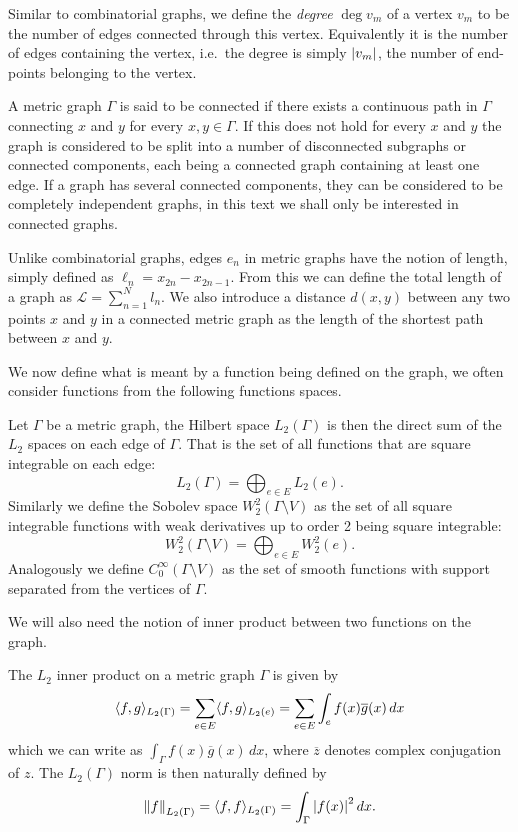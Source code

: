 Similar to combinatorial graphs, we define the \emph{degree} $\deg v_m$ of a vertex $v_m$ to be the number of edges connected through this vertex. Equivalently it is the number of edges containing the vertex, i.e.\ the degree is simply $\left\lvert v_m\right\rvert$, the number of end-points belonging to the vertex.

A metric graph $\Gamma$ is said to be connected if there exists a continuous path in $\Gamma$ connecting $x$ and $y$ for every $x, y \in \Gamma$. If this does not hold for every $x$ and $y$ the graph is considered to be split into a number of disconnected subgraphs or connected components, each being a connected graph containing at least one edge. If a graph has several connected components, they can be considered to be completely independent graphs, in this text we shall only be interested in connected graphs.

Unlike combinatorial graphs, edges $e_n$ in metric graphs have the notion of length, simply defined as $\ell_n = x_{2n} - x_{2n-1}$. From this we can define the total length of a graph as $\mathcal{L} = \sum_{n=1}^{N} l_n$. We also introduce a distance $d(x, y)$ between any two points $x$ and $y$ in a connected metric graph as the length of the shortest path between $x$ and $y$.

We now define what is meant by a function being defined on the graph, we often consider functions from the following functions spaces.

\begin{definition}
  Let $\Gamma$ be a metric graph, the Hilbert space $L_2(\Gamma)$ is then the direct sum of the $L_2$ spaces on each edge of $\Gamma$. That is the set of all functions that are square integrable on each edge:
  \[
    L_2(\Gamma) = \bigoplus_{e \in E} L_2(e).
  \]
  Similarly we define the Sobolev space $W_2^2(\Gamma\setminus V)$ as the set of all square integrable functions with weak derivatives up to order 2 being square integrable:
  \[
    W_2^2(\Gamma\setminus V) = \bigoplus_{e \in E} W_2^2(e).
  \]
  Analogously we define $C^\infty_0(\Gamma\setminus V)$ as the set of smooth functions with support separated from the vertices of $\Gamma$.
\end{definition}

We will also need the notion of inner product between two functions on the graph.

\begin{definition}\label{def: inner product on graph}
  The $L_2$ inner product on a metric graph $\Gamma$ is given by
  \[
    \langle f, g \rangle_{L_2(\Gamma)} =
    \sum_{e \in E} \langle f, g \rangle_{L_2(e)} =
    \sum_{e \in E} \int_e f(x)\overline{g}(x)\,dx
  \]
  which we can write as $\int_\Gamma f(x)\overline{g}(x)\,dx$, where $\overline{z}$ denotes complex conjugation of $z$.
  The $L_2(\Gamma)$ norm is then naturally defined by
  \[
    \left\lVert f\right\rVert_{L_2(\Gamma)} = \langle f, f \rangle_{L_2(\Gamma)} = \int_{\Gamma} \left\lvert f(x)\right\rvert^2 dx.
  \]
\end{definition}

